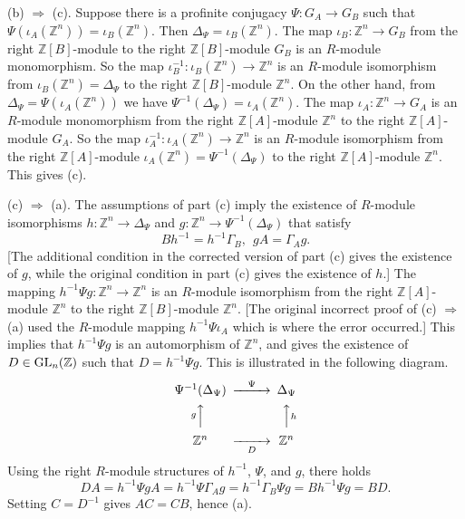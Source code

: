 \documentclass{amsart}
\theoremstyle{plain}
\theoremstyle{definition}
\theoremstyle{remark}
\begin{document}
(b) $\Rightarrow$ (c). Suppose there is a profinite conjugacy $\Psi:G_A\to G_B$ such that $\Psi(\iota_A({\mathbb Z}^n)) = \iota_B({\mathbb Z}^n)$. Then $\Delta_\Psi= \iota_B({\mathbb Z}^n)$. The map $\iota_B:{\mathbb Z}^n\to G_B$ from the right ${\mathbb Z}[B]$-module to the right ${\mathbb Z}[B]$-module $G_B$ is an $R$-module monomorphism. So the map $\iota_B^{-1}: \iota_B({\mathbb Z}^n)\to {\mathbb Z}^n$ is an $R$-module isomorphism from $\iota_B({\mathbb Z}^n) = \Delta_\Psi$ to the right ${\mathbb Z}[B]$-module ${\mathbb Z}^n$. On the other hand, from $\Delta_\Psi = \Psi(\iota_A({\mathbb Z}^n))$ we have $ \Psi^{-1}( \Delta_\Psi) = \iota_A({\mathbb Z}^n)$. The map $\iota_A:{\mathbb Z}^n\to G_A$ is an $R$-module monomorphism from the right ${\mathbb Z}[A]$-module ${\mathbb Z}^n$ to the right ${\mathbb Z}[A]$-module $G_A$. So the map $\iota_A^{-1}: \iota_A({\mathbb Z}^n)\to {\mathbb Z}^n$ is an $R$-module isomorphism from the right ${\mathbb Z}[A]$-module $\iota_A({\mathbb Z}^n) = \Psi^{-1}(\Delta_\Psi)$ to the right ${\mathbb Z}[A]$-module ${\mathbb Z}^n$. This gives (c).

(c) $\Rightarrow$ (a). The assumptions of part (c) imply the existence of $R$-module isomorphisms $h:{\mathbb Z}^n\to \Delta_\Psi$ and $g:{\mathbb Z}^n \to \Psi^{-1}(\Delta_\Psi)$ that satisfy
\[ B h^{-1} = h^{-1} \Gamma_B,\ \ gA = \Gamma_A g.\]
[The additional condition in the corrected version of part (c) gives the existence of $g$, while the original condition in part (c) gives the existence of $h$.] The mapping $h^{-1}\Psi g:{\mathbb Z}^n\to {\mathbb Z}^n$ is an $R$-module isomorphism from the right ${\mathbb Z}[A]$-module ${\mathbb Z}^n$ to the right ${\mathbb Z}[B]$-module ${\mathbb Z}^n$. [The original incorrect proof of (c) $\Rightarrow$ (a) used the $R$-module mapping $h^{-1}\Psi \iota_A$ which is where the error occurred.] This implies that $h^{-1}\Psi g$ is an automorphism of ${\mathbb Z}^n$, and gives the existence of $D\in {\rm GL}_n({\mathbb Z})$ such that $D = h^{-1}\Psi g$. This is illustrated in the following diagram.
\[ \begin{CD}
\Psi^{-1}(\Delta_\Psi) @>\Psi>> \Delta_\Psi  \\ 
@AgAA            @ AAhA \\
{\mathbb Z}^n  @>>D>   {\mathbb Z}^n
\end{CD}
\]
Using the right $R$-module structures of $h^{-1}$, $\Psi$, and $g$, there holds
\[ DA = h^{-1}\Psi gA = h^{-1}\Psi \Gamma_A g = h^{-1}\Gamma_B \Psi g = Bh^{-1} \Psi g = BD.\]
Setting $C = D^{-1}$ gives $AC = CB$, hence (a).
\end{document}
